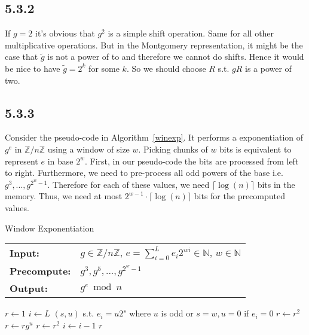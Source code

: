 \documentclass[12pt,a4paper]{article}
\newcommand {\zpz}[1]{\mathbb{Z}/#1\mathbb{Z}}
\begin{document}
    \subsection*{5.3.2}
    If $g=2$ it's obvious that $g^2$ is a simple shift operation. Same for all other multiplicative operations.
    But in the Montgomery representation, it might be the case that $\tilde{g}$ is not a power of to and therefore we cannot do shifts.
    Hence it would be nice to have $\tilde{g} = 2^k$ for some $k$. So we should choose $R$ s.t. $gR$ is a power of two.
    \subsection*{5.3.3}
    Consider the pseudo-code in Algorithm~\ref{winexp}. It performs a exponentiation of $g^e$ in $\zpz{n}$ using a window of size $w$.
    Picking chunks of $w$ bits is equivalent to represent $e$ in base $2^w$.
    First, in our pseudo-code the bits are processed from left to right. Furthermore, we need to pre-process all odd powers of the base i.e.
    $g^3,...,g^{2^w-1}$. Therefore for each of these values, we need $\lceil\log(n)\rceil$ bits in the memory. 
    Thus, we need at most $2^{w-1}\cdot\lceil\log(n)\rceil$ bits for the precomputed values.
    \begin{algorithm}{}
        \caption{Window Exponentiation}\label{winexp}
        \begin{tabular}{l l}
            \textbf{Input:} & $g \in \zpz{n}$, $e = \sum_{i=0}^{L} e_i 2^{wi}\in\mathbb{N}$, $w \in \mathbb{N}$\\
            \textbf{Precompute:} & $g^3,g^5,...,g^{2^w-1}$\\
            \textbf{Output:} &  $g^e \bmod n$
        \end{tabular}
        \begin{algorithmic}[1]
            \State $r \gets 1$
            \State $i \gets L$
                \State $(s,u)$ s.t. $e_i = u2^s$ where $u$ is odd or $s=w,u=0$ if $e_i = 0$
                    \State $r \gets r^2$
                \EndFor
                \State $r \gets rg^u$
                    \State $r \gets r^2$
                \EndFor
                \State $i \gets i-1$
            \EndWhile
            \State \Return $r$
        \EndFunction
        \end{algorithmic}
    \end{algorithm}
\end{document}
